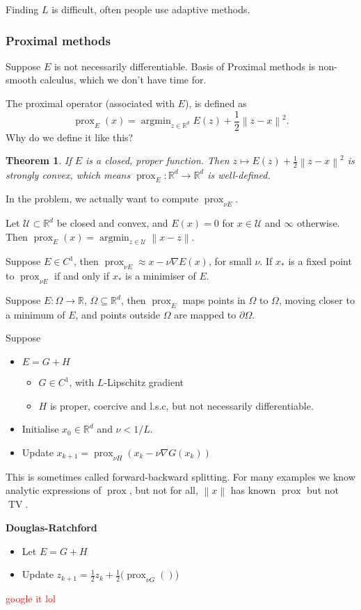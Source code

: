 \documentclass[12pt]{article}
\newtheorem{theorem}{Theorem}[section]
\theoremstyle{definition}
\newcommand{\real}{\mathbb{R}}   %
\DeclareMathOperator{\argmin}{argmin}
\DeclareMathOperator{\prox}{prox}
\DeclareMathOperator{\TV}{TV}
\newcommand\norm[1]{\left\lVert#1\right\rVert}
\begin{document}
Finding $L$ is difficult, often people use adaptive methods. 

\subsubsection{Proximal methods}
Suppose $E$ is not necessarily differentiable. Basis of Proximal methods is non-smooth calculus, which we don't have time for.

The proximal operator (associated with $E$), is defined as 
\begin{equation*}
    \prox_E(x) = \argmin_{z\in\real^d} E(z) + \frac{1}{2}\norm{z-x}^2.
\end{equation*}
Why do we define it like this?
\begin{theorem}
    If $E$ is a closed, proper function. Then $z\mapsto E(z) + \frac{1}{2}\norm{z-x}^2$ is strongly convex, which means $\prox_E:\real^d\to\real^d$ is well-defined.
\end{theorem}
In the problem, we actually want to compute $\prox_{\nu E}$. 

Let $\mathcal{U}\subset \real^d$ be closed and convex, and $E(x) = 0$ for $x\in \mathcal{U}$ and $\infty$ otherwise. Then $\prox_E(x) = \argmin_{z\in \mathcal{U}} \norm{x-z}$. 

Suppose $E\in C^1$, then $\prox_{\nu E} \approx x- \nu \nabla E(x)$, for small $\nu$. If $x_*$ is a fixed point to $\prox_{\nu E}$ if and only if $x_*$ is a minimiser of $E$. 

Suppose $E:\Omega\to\real$, $\Omega\subseteq \real^d$, then $\prox_E$ maps points in $\Omega$ to $\Omega$, moving closer to a minimum of $E$, and points outside $\Omega$ are mapped to $\partial \Omega$. 

Suppose 
\begin{itemize}
    \item $E=G+H$
    \begin{itemize}
        \item $G\in C^1$, with $L$-Lipschitz gradient
        \item $H$ is proper, coercive and l.s.c, but not necessarily differentiable.
    \end{itemize}
    \item Initialise $x_0\in\real^d$ and $\nu<1/L$.
    \item Update $x_{k+1} = \prox_{\nu H}(x_k - \nu \nabla G(x_k))$
\end{itemize}

This is sometimes called forward-backward splitting.
For many examples we know analytic expressions of $\prox$, but not for all, $\norm{x}$ has known $\prox$ but not $\TV$.

\textbf{Douglas-Ratchford}
\begin{itemize}
    \item Let $E=G+H$
    \item Update $z_{k+1} = \frac{1}{2}z_k + \frac{1}{2}(\prox_{\nu G}()$)
\end{itemize}

\textcolor{red}{google it lol}
\end{document}
